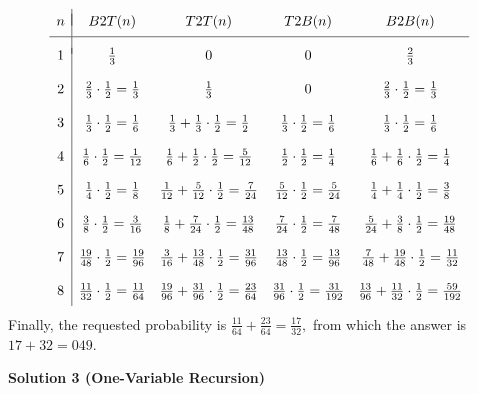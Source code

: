 \begin{enumerate}
 \[\begin{array}{c|cccc}  &  &  &  & \\ [-2ex] n & B2T(n) & T2T(n) & T2B(n) & B2B(n) \\ [1ex] \hline  &  &  &  & \\ [-1ex] 1 & \frac13 & 0 & 0 & \frac23\\  &  &  &  & \\ 2 & \frac23 \cdot \frac12 = \frac13 & \frac13 & 0 & \frac23 \cdot \frac12 = \frac13 \\  &  &  &  & \\ 3 & \frac13 \cdot \frac12 = \frac16 & \frac13 + \frac13 \cdot \frac12 = \frac12 & \frac13 \cdot \frac12 = \frac16 & \frac13 \cdot \frac12 = \frac16 \\  &  &  &  & \\ 4 & \frac16 \cdot \frac12 = \frac{1}{12} & \frac16 + \frac12 \cdot \frac12 = \frac{5}{12} & \frac12 \cdot \frac12 = \frac14 & \frac16 + \frac16 \cdot \frac12 = \frac14 \\  &  &  &  & \\ 5 & \frac14 \cdot \frac12 = \frac18 & \frac{1}{12} + \frac{5}{12} \cdot \frac{1}{2} = \frac{7}{24} & \frac{5}{12} \cdot \frac12 = \frac{5}{24} & \frac14 + \frac14 \cdot \frac12 = \frac38 \\  &  &  &  & \\ 6 & \frac38 \cdot \frac12 = \frac{3}{16} & \frac18 + \frac{7}{24} \cdot \frac12 = \frac{13}{48} & \frac{7}{24} \cdot \frac12 = \frac{7}{48} & \frac{5}{24} + \frac38 \cdot \frac12 = \frac{19}{48} \\  &  &  &  & \\ 7 & \frac{19}{48} \cdot \frac12 = \frac{19}{96}&  \frac{3}{16} + \frac{13}{48} \cdot \frac{1}{2} = \frac{31}{96}& \frac{13}{48} \cdot \frac{1}{2} = \frac{13}{96} & \frac{7}{48} + \frac{19}{48} \cdot \frac12 = \frac{11}{32}\\  &  &  &  & \\ 8 & \frac{11}{32} \cdot \frac{1}{2} = \frac{11}{64} & \frac{19}{96} + \frac{31}{96} \cdot \frac12 = \frac{23}{64} & \frac{31}{96} \cdot \frac12 = \frac{31}{192} & \frac{13}{96} + \frac{11}{32} \cdot \frac12 = \frac{59}{192} \\ [1ex] \end{array}\]Finally, the requested probability is $\frac{11}{64} + \frac{23}{64} = \frac{17}{32},$ from which the answer is $17 + 32 = \boxed{049}.$




\textbf{Solution 3 (One-Variable Recursion)}


\end{enumerate}
